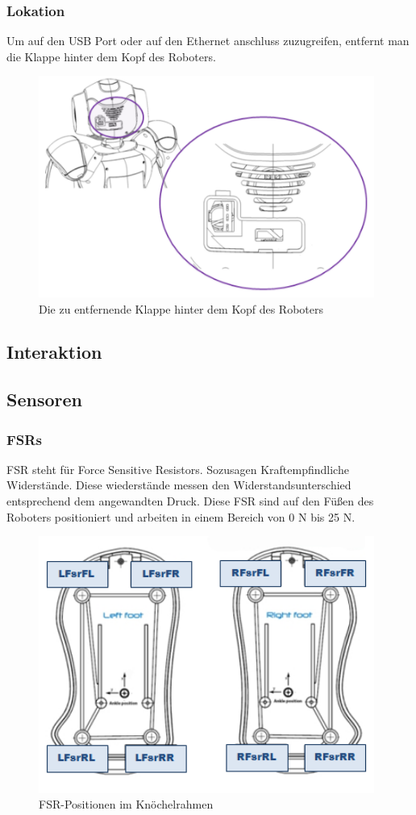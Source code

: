 \documentclass[12pt]{article}  %
\begin{document}
		\subsubsection{Lokation}
			Um auf den USB Port oder auf den Ethernet anschluss zuzugreifen, entfernt man 
			die Klappe hinter dem Kopf des Roboters.
				\begin{figure}[h]
				\centering
				\includegraphics[width=110mm]{Bilder/Mert/Klappe.png}
				\caption{Die zu entfernende Klappe hinter dem Kopf des Roboters}
				\label{Klappe hinter dem Kopf des Roboters}
				\end{figure}						
			
			
	\subsection{Interaktion}
	\subsection{Sensoren}
		\subsubsection{FSRs}
			FSR steht für Force Sensitive Resistors. Sozusagen Kraftempfindliche 
			Widerstände. Diese wiederstände messen den Widerstandsunterschied entsprechend 
			dem angewandten Druck. Diese FSR sind auf den Füßen des Roboters positioniert 
			und arbeiten in einem Bereich von 0 N bis 25 N.
			\begin{figure}[h]
			\centering
			\includegraphics[width=110mm]{Bilder/Mert/FSR.jpg}
			\caption{FSR-Positionen im Knöchelrahmen}
			\label{FSR-Positionen}
			\end{figure}			
\end{document}
